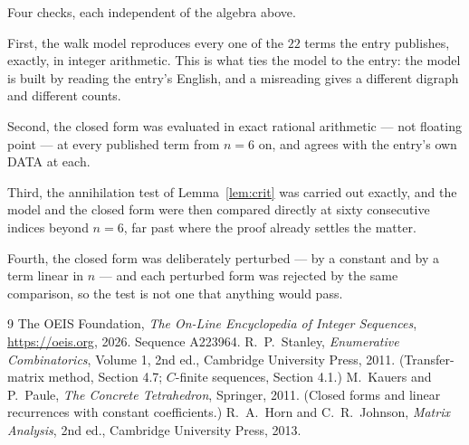 \documentclass[11pt,a4paper]{article}
\theoremstyle{plain}
\theoremstyle{definition}
\begin{document}
Four checks, each independent of the algebra above.

First, the walk model reproduces every one of the $22$ terms the entry publishes,
exactly, in integer arithmetic. This is what ties the model to the entry: the model is built
by reading the entry's English, and a misreading gives a different digraph and different
counts.

Second, the closed form was evaluated in exact rational arithmetic --- not floating point ---
at every published term from $n=6$ on, and agrees with the entry's own DATA at each.

Third, the annihilation test of Lemma~\ref{lem:crit} was carried out exactly, and the model
and the closed form were then compared directly at sixty consecutive indices beyond
$n=6$, far past where the proof already settles the matter.

Fourth, the closed form was deliberately perturbed --- by a constant and by a term linear in
$n$ --- and each perturbed form was rejected by the same comparison, so the test is not one
that anything would pass.

\begin{thebibliography}{9}
 The OEIS Foundation, \emph{The On-Line Encyclopedia of Integer
Sequences}, \url{https://oeis.org}, 2026. Sequence A223964.
 R.~P.~Stanley, \emph{Enumerative Combinatorics}, Volume 1, 2nd ed.,
Cambridge University Press, 2011. (Transfer-matrix method, Section 4.7; $C$-finite sequences,
Section 4.1.)
 M.~Kauers and P.~Paule, \emph{The Concrete Tetrahedron}, Springer, 2011.
(Closed forms and linear recurrences with constant coefficients.)
 R.~A.~Horn and C.~R.~Johnson, \emph{Matrix Analysis}, 2nd ed., Cambridge
University Press, 2013.
\end{thebibliography}
\end{document}
